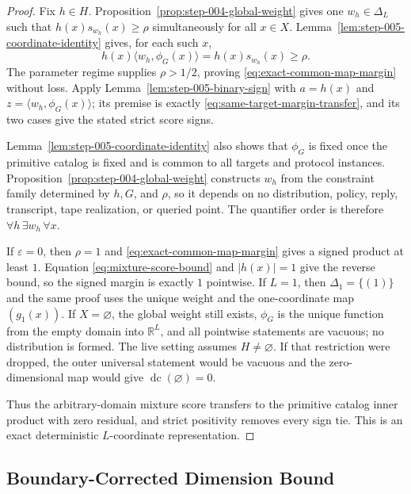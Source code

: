 \begin{proof}
Fix $h\in H$.  Proposition~\ref{prop:step-004-global-weight} gives one
$w_h\in\Delta_L$ such that
$h(x)s_{w_h}(x)\ge\rho$ simultaneously for all $x\in X$.
Lemma~\ref{lem:step-005-coordinate-identity} gives, for each such $x$,
\begin{equation}\label{eq:same-target-margin-transfer}
h(x)\langle w_h,\phi_G(x)\rangle
=h(x)s_{w_h}(x)\ge\rho.
\end{equation}
The parameter regime supplies $\rho>1/2$, proving
\eqref{eq:exact-common-map-margin} without loss.  Apply
Lemma~\ref{lem:step-005-binary-sign} with
$a=h(x)$ and $z=\langle w_h,\phi_G(x)\rangle$; its premise is exactly
\eqref{eq:same-target-margin-transfer}, and its two cases give the stated
strict score signs.

Lemma~\ref{lem:step-005-coordinate-identity} also shows that $\phi_G$ is
fixed once the primitive catalog is fixed and is common to all targets and
protocol instances.  Proposition~\ref{prop:step-004-global-weight} constructs
$w_h$ from the constraint family determined by $h,G$, and $\rho$, so it
depends on no distribution, policy, reply, transcript, tape realization, or
queried point.  The quantifier order is therefore
$\forall h\,\exists w_h\,\forall x$.

If $\varepsilon=0$, then $\rho=1$ and
\eqref{eq:exact-common-map-margin} gives a signed product at least $1$.
Equation \eqref{eq:mixture-score-bound} and $|h(x)|=1$ give the reverse
bound, so the signed margin is exactly $1$ pointwise.  If $L=1$, then
$\Delta_1=\{(1)\}$ and the same proof uses the unique weight and the
one-coordinate map $(g_1(x))$.  If $X=\varnothing$, the global weight still
exists, $\phi_G$ is the unique function from the empty domain into
$\mathbb R^L$, and all pointwise statements are vacuous; no distribution is
formed.  The live setting assumes $H\ne\varnothing$.  If that restriction
were dropped, the outer universal statement would be vacuous and the
zero-dimensional map would give $\operatorname{dc}(\varnothing)=0$.

Thus the arbitrary-domain mixture score transfers to the primitive catalog
inner product with zero residual, and strict positivity removes every sign
tie.  This is an exact deterministic $L$-coordinate representation.
\end{proof}

\subsection{Boundary-Corrected Dimension Bound}
\label{app:dimension-bound}

